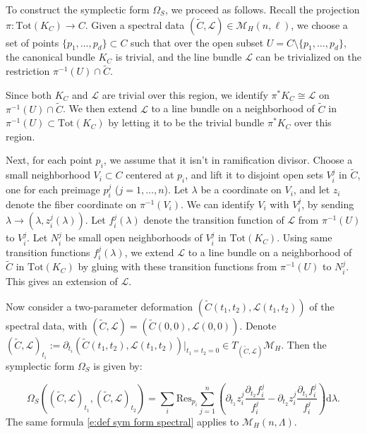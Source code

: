\documentclass[twoside, 11pt]{article}
\numberwithin{equation}{section}
\theoremstyle{theorem}
\numberwithin{theorem}{section}
\theoremstyle{definition}
\begin{document}
To construct the symplectic form $\Omega_S$, we proceed as follows. Recall the projection 
$\pi: \mathrm{Tot}(K_C) \to C.$ Given a spectral data \((\widetilde{C},\mathcal{L}) \in \mathcal{M}_{H}(n, \ell)\), we choose a set of points \(\{p_1, \dots, p_d\} \subset C\) such that over the open subset \(U = C \setminus \{p_1, \dots, p_d\}\), the canonical bundle \(K_C\) is trivial, and the line bundle \(\mathcal{L}\) can be trivialized on the restriction \(\pi^{-1}(U) \cap \widetilde{C}\). 


 Since both \(K_C\) and \(\mathcal{L}\) are trivial over this region, we identify \(\pi^* K_C \cong \mathcal{L}\) on \(\pi^{-1}(U) \cap \widetilde{C}\). We then extend \(\mathcal{L}\) to a line bundle on a neighborhood of \(\widetilde{C}\) in \(\pi^{-1}(U) \subset \mathrm{Tot}(K_C)\) by letting it to be the trivial bundle \(\pi^* K_C\) over this region.

Next, for each point \(p_i\), we assume that it isn't in ramification divisor. Choose a small neighborhood \(V_i \subset C\) centered at \(p_i\), and lift it to disjoint open sets \(V_i^j\) in \(\widetilde{C}\), one for each preimage \(p_i^j\) (\(j = 1, \dots, n\)). Let \(\lambda\) be a coordinate on \(V_i\), and let \(z_i\) denote the fiber coordinate on \(\pi^{-1}(V_i)\). We can identify $V_i$ with $V_i^j$, by sending $ \lambda \to (\lambda,z_i^j(\lambda))$.
Let \( f_i^j(\lambda) \) denote the transition function of \( \mathcal{L} \) from \( \pi^{-1}(U) \) to \( V_i^j \).
 Let \(N_i^j\) be small open neighborhoods of \(V_i^j\) in \(\mathrm{Tot}(K_C)\). Using same transition functions \(f_i^j(\lambda)\), we extend \(\mathcal{L}\) to a line bundle on a neighborhood of \(\widetilde{C}\) in \(\mathrm{Tot}(K_C)\) by gluing with these transition functions from $\pi^{-1}(U)$ to $N_i^j$. This gives an extension of \(\mathcal{L}\).

Now consider a two-parameter deformation \((\widetilde{C}(t_1, t_2), \mathcal{L}(t_1, t_2))\) of the spectral data, with \((\widetilde{C}, \mathcal{L}) = (\widetilde{C}(0,0), \mathcal{L}(0,0))\). Denote \((\widetilde{C}, \mathcal{L})_{t_i} :=\partial_{t_i}(\widetilde{C}(t_1,t_2),\mathcal{L}(t_1,t_2))\Big|_{t_1=t_2=0} \in {T_{ (\widetilde{C}, \mathcal{L})}\mathcal{M}_{H}}.\) Then the symplectic form \(\Omega_S\) is given by:

\begin{equation}\label{e:def sym form spectral}
    \Omega_S \left( (\widetilde{C},\mathcal{L})_{t_1}, (\widetilde{C},\mathcal{L})_{t_2}\right) = \sum_i \mathrm{Res}_{p_i} \sum_{j=1}^{n} \left( \partial_{t_1} z_i^j \frac{\partial_{t_2} f_i^j}{f_i^j} - \partial_{t_2} z_i^j \frac{\partial_{t_1} f_i^j}{f_i^j}  \right) \mathrm{d} \lambda.
\end{equation}
The same formula \eqref{e:def sym form spectral} applies to $\mathcal{M}_H(n,\Lambda)$.
\end{document}
